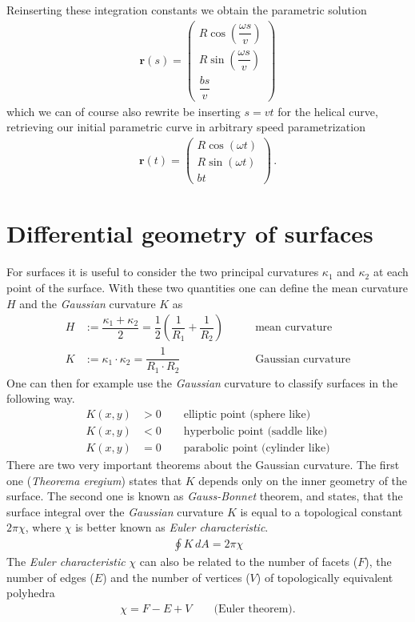 \documentclass[11pt, DINA4, fleqn]{amsart}
\def\vr{\boldsymbol{r}\xspace}
\begin{document}
Reinserting these integration constants we obtain the parametric solution
\begin{align}
\vr(s) = \begin{pmatrix}
R\cos\left(\dfrac{\omega s}{v}\right) \\
R\sin\left(\dfrac{\omega s}{v}\right) \\
\dfrac{bs}{v}
\end{pmatrix}
\end{align}
which we can of course also rewrite be inserting $s = vt$ for the helical curve,
retrieving our initial parametric curve in arbitrary speed parametrization
\begin{align}
\vr(t) = \begin{pmatrix}
R\cos\left(\omega t\right) \\
R\sin\left(\omega t\right) \\
bt
\end{pmatrix} \, .
\end{align}

\section{Differential geometry of surfaces}

For surfaces it is useful to consider the two principal curvatures $\kappa_1$ and $\kappa_2$ at each point of the surface. With these two quantities
one can define the mean curvature $H$ and the \emph{Gaussian} curvature $K$ as
\begin{align}
H&:=  \dfrac{\kappa_1 + \kappa_2}{2} = \dfrac{1}{2}\left(\dfrac{1}{R_1} + \dfrac{1}{R_2}\right) \qquad & \text{mean curvature} \\
K&:= \kappa_1 \cdot \kappa_2 = \dfrac{1}{R_1\cdot R_2} \qquad & \text{Gaussian curvature}
\end{align}
One can then for example use the \emph{Gaussian} curvature to classify
surfaces in the following way.
\begin{align}
K(x,y) &>0 \qquad \text{elliptic point (sphere like)} \\
K(x,y) &<0 \qquad \text{hyperbolic point (saddle like)} \\
K(x,y) &=0 \qquad \text{parabolic point (cylinder like)}
\end{align}
There are two very important theorems about the Gaussian curvature.
The first one (\emph{Theorema eregium}) states that $K$ depends only on the inner geometry of the surface. The second one is known as \emph{Gauss-Bonnet} theorem, and states, that the surface integral over the \emph{Gaussian} curvature $K$ is equal to a topological constant $2\pi\chi$, where $\chi$ is better known as \emph{Euler characteristic}.
\begin{align}
\oint K \, dA = 2 \pi \chi
\end{align}
The \emph{Euler characteristic} $\chi$ can also be related to the number of facets ($F$), the number of edges ($E$) and the number of vertices ($V$) of topologically equivalent polyhedra
\begin{align}
\chi = F - E + V  \qquad \text{(Euler theorem)}.
\end{align}
\end{document}
